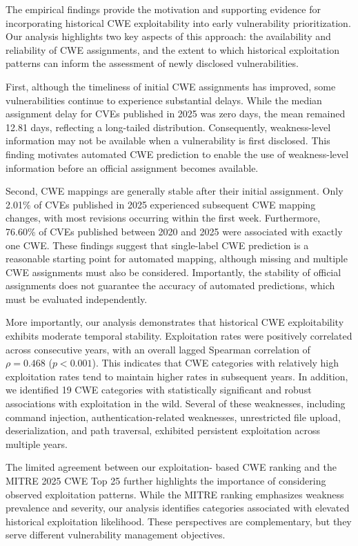 \documentclass[conference,compsoc]{IEEEtran}
\begin{document}
The empirical findings provide the motivation and
supporting evidence for incorporating historical
CWE exploitability into early vulnerability
prioritization. Our analysis highlights two key
aspects of this approach: the availability and
reliability of CWE assignments, and the extent
to which historical exploitation patterns can
inform the assessment of newly disclosed
vulnerabilities.

First, although the timeliness of initial CWE
assignments has improved, some vulnerabilities
continue to experience substantial delays.
While the median assignment delay for CVEs
published in 2025 was zero days, the mean
remained 12.81 days, reflecting a long-tailed
distribution. Consequently, weakness-level
information may not be available when a
vulnerability is first disclosed. This finding
motivates automated CWE prediction to enable
the use of weakness-level information before
an official assignment becomes available.

Second, CWE mappings are generally stable after
their initial assignment. Only 2.01\% of CVEs
published in 2025 experienced subsequent CWE
mapping changes, with most revisions occurring
within the first week. Furthermore, 76.60\%
of CVEs published between 2020 and 2025 were
associated with exactly one CWE. These findings
suggest that single-label CWE prediction is a
reasonable starting point for automated mapping,
although missing and multiple CWE assignments
must also be considered. Importantly, the
stability of official assignments does not
guarantee the accuracy of automated predictions,
which must be evaluated independently.

More importantly, our analysis demonstrates
that historical CWE exploitability exhibits
moderate temporal stability. Exploitation rates
were positively correlated across consecutive
years, with an overall lagged Spearman correlation
of $\rho=0.468$ ($p<0.001$). This indicates
that CWE categories with relatively high
exploitation rates tend to maintain higher
rates in subsequent years. In addition, we
identified 19 CWE categories with statistically
significant and robust associations with
exploitation in the wild. Several of these
weaknesses, including command injection,
authentication-related weaknesses, unrestricted
file upload, deserialization, and path traversal,
exhibited persistent exploitation across
multiple years.

The limited agreement between our exploitation-
based CWE ranking and the MITRE 2025 CWE Top 25
further highlights the importance of considering
observed exploitation patterns. While the MITRE
ranking emphasizes weakness prevalence and
severity, our analysis identifies categories
associated with elevated historical exploitation
likelihood. These perspectives are complementary,
but they serve different vulnerability management
objectives.
\end{document}
